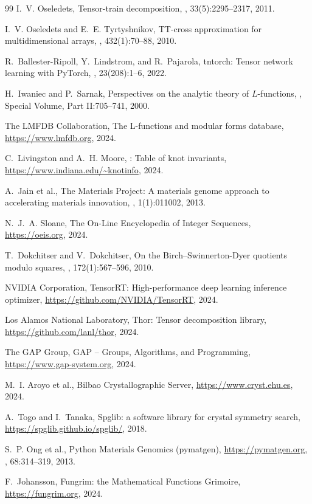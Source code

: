 \documentclass[11pt,a4paper]{article}
\begin{document}

\begin{thebibliography}{99}
I.~V. Oseledets,
\newblock Tensor-train decomposition,
, 33(5):2295--2317, 2011.

I.~V. Oseledets and E.~E. Tyrtyshnikov,
\newblock TT-cross approximation for multidimensional arrays,
, 432(1):70--88, 2010.

R.~Ballester-Ripoll, Y.~Lindstrom, and R.~Pajarola,
\newblock tntorch: Tensor network learning with {PyTorch},
, 23(208):1--6, 2022.

H.~Iwaniec and P.~Sarnak,
\newblock Perspectives on the analytic theory of {$L$}-functions,
, Special Volume, Part II:705--741, 2000.

The LMFDB Collaboration,
\newblock The {L}-functions and modular forms database,
\newblock \url{https://www.lmfdb.org}, 2024.

C.~Livingston and A.~H. Moore,
: Table of knot invariants,
\newblock \url{https://www.indiana.edu/~knotinfo}, 2024.

A.~Jain et al.,
\newblock The {Materials Project}: A materials genome approach to accelerating materials innovation,
, 1(1):011002, 2013.

N.~J.~A. Sloane,
\newblock The {On-Line Encyclopedia of Integer Sequences},
\newblock \url{https://oeis.org}, 2024.

T.~Dokchitser and V.~Dokchitser,
\newblock On the {B}irch--{S}winnerton-{D}yer quotients modulo squares,
, 172(1):567--596, 2010.

NVIDIA Corporation,
\newblock TensorRT: High-performance deep learning inference optimizer,
\newblock \url{https://github.com/NVIDIA/TensorRT}, 2024.

Los Alamos National Laboratory,
\newblock Thor: Tensor decomposition library,
\newblock \url{https://github.com/lanl/thor}, 2024.

The GAP Group,
\newblock GAP -- Groups, Algorithms, and Programming,
\newblock \url{https://www.gap-system.org}, 2024.

M.~I. Aroyo et al.,
\newblock Bilbao Crystallographic Server,
\newblock \url{https://www.cryst.ehu.es}, 2024.

A.~Togo and I.~Tanaka,
\newblock Spglib: a software library for crystal symmetry search,
\newblock \url{https://spglib.github.io/spglib/}, 2018.

S.~P. Ong et al.,
\newblock Python Materials Genomics (pymatgen),
\newblock \url{https://pymatgen.org},
, 68:314--319, 2013.

F.~Johansson,
\newblock Fungrim: the Mathematical Functions Grimoire,
\newblock \url{https://fungrim.org}, 2024.
\end{thebibliography}
\end{document}
